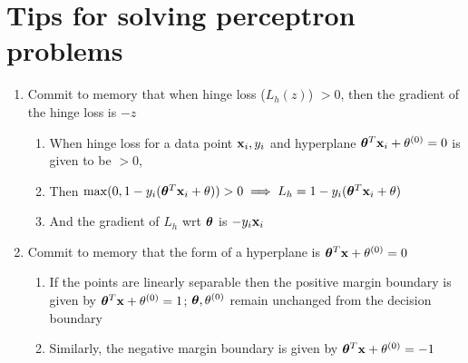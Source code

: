 \section {Tips for solving perceptron problems}
\begin {enumerate}
\item Commit to memory that when hinge loss ($L_h(z)$) $> 0$, then the gradient of the hinge loss is $-z$
  \begin {enumerate}
  \item When hinge loss for a data point $\mathbf{x}_i, y_i$ and hyperplane $\bm{\theta}^T \mathbf{x}_i + \mathrm{\theta^{(0)}} = 0$ is given to be $> 0$, 
  \item Then $\max(0, 1 - y_i(\bm{\theta}^T \mathbf{x}_i + \theta)) > 0 \implies L_h = 1 - y_i(\bm{\theta}^T \mathbf{x}_i + \theta)$
  \item And the gradient of $L_h$ wrt $\bm{\theta}$ is $- y_i \mathbf{x}_i$
  \end {enumerate}
\item Commit to memory that the form of a hyperplane is $\bm{\theta}^T \mathbf{x} + \mathrm{\theta^{(0)}} = 0$
  \begin {enumerate}
  \item If the points are linearly separable then the positive margin boundary is given by $\bm{\theta}^T \mathbf{x} + \mathrm{\theta^{(0)}} = 1$; $\bm{\theta}, \mathrm{\theta^{(0)}}$ remain unchanged from the decision boundary
  \item Similarly, the negative margin boundary is given by $\bm{\theta}^T \mathbf{x} + \mathrm{\theta^{(0)}} = -1$
  \end {enumerate}
\end {enumerate}

